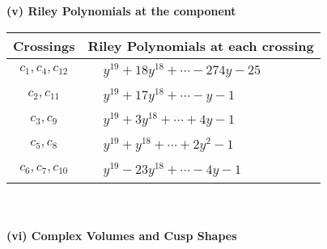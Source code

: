 \documentclass[1p]{elsarticle_modified}
\theoremstyle{definition}
\begin{document}
\newpage\renewcommand{\arraystretch}{1}
\flushleft \textbf{(v) Riley Polynomials at the component}\newline \\
\begin{tabular}{m{50pt}|m{274pt}}
Crossings & \hspace{64pt}Riley Polynomials at each crossing \\
\hline $$\begin{aligned}c_{1},c_{4},c_{12}\end{aligned}$$&$\begin{aligned}
&y^{19}+18 y^{18}+\cdots-274 y-25
\end{aligned}$\\
\hline $$\begin{aligned}c_{2},c_{11}\end{aligned}$$&$\begin{aligned}
&y^{19}+17 y^{18}+\cdots- y-1
\end{aligned}$\\
\hline $$\begin{aligned}c_{3},c_{9}\end{aligned}$$&$\begin{aligned}
&y^{19}+3 y^{18}+\cdots+4 y-1
\end{aligned}$\\
\hline $$\begin{aligned}c_{5},c_{8}\end{aligned}$$&$\begin{aligned}
&y^{19}+y^{18}+\cdots+2 y^2-1
\end{aligned}$\\
\hline $$\begin{aligned}c_{6},c_{7},c_{10}\end{aligned}$$&$\begin{aligned}
&y^{19}-23 y^{18}+\cdots-4 y-1
\end{aligned}$\\
\hline
\end{tabular}\\~\\
\newpage\flushleft \textbf{(vi) Complex Volumes and Cusp Shapes}
\end{document}
